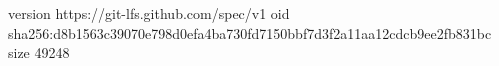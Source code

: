 version https://git-lfs.github.com/spec/v1
oid sha256:d8b1563c39070e798d0efa4ba730fd7150bbf7d3f2a11aa12cdcb9ee2fb831bc
size 49248
